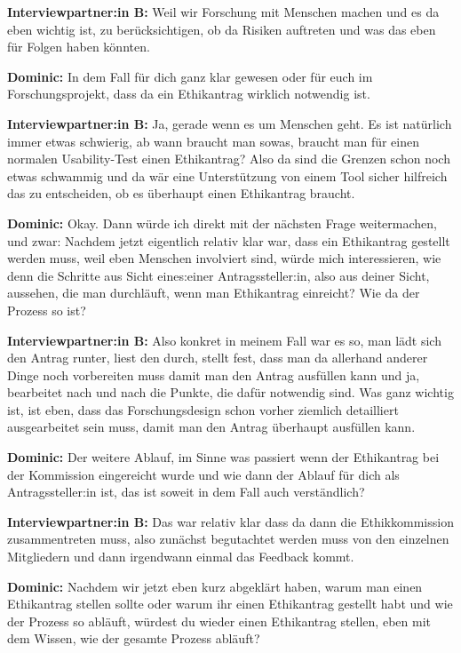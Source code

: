 \documentclass[a4paper,12pt,twoside]{scrreprt}
\begin{document}
\textbf{Interviewpartner:in B:} Weil wir Forschung mit Menschen machen und es da eben wichtig ist, zu berücksichtigen, ob da Risiken auftreten und was das eben für Folgen haben könnten.

\textbf{Dominic:} In dem Fall für dich ganz klar gewesen oder für euch im Forschungsprojekt, dass da ein Ethikantrag wirklich notwendig ist.

\textbf{Interviewpartner:in B:} Ja, gerade wenn es um Menschen geht. Es ist natürlich immer etwas schwierig, ab wann braucht man sowas, braucht man für einen normalen Usability-Test einen Ethikantrag? Also da sind die Grenzen schon noch etwas schwammig und da wär eine Unterstützung von einem Tool sicher hilfreich das zu entscheiden, ob es überhaupt einen Ethikantrag braucht.

\textbf{Dominic:} Okay. Dann würde ich direkt mit der nächsten Frage weitermachen, und zwar: Nachdem jetzt eigentlich relativ klar war, dass ein Ethikantrag gestellt werden muss, weil eben Menschen involviert sind, würde mich interessieren, wie denn die Schritte aus Sicht eines:einer Antragssteller:in, also aus deiner Sicht, aussehen, die man durchläuft, wenn man Ethikantrag einreicht? Wie da der Prozess so ist?

\textbf{Interviewpartner:in B:} Also konkret in meinem Fall war es so, man lädt sich den Antrag runter, liest den durch, stellt fest, dass man da allerhand anderer Dinge noch vorbereiten muss damit man den Antrag ausfüllen kann und ja, bearbeitet nach und nach die Punkte, die dafür notwendig sind. Was ganz wichtig ist, ist eben, dass das Forschungsdesign schon vorher ziemlich detailliert ausgearbeitet sein muss, damit man den Antrag überhaupt ausfüllen kann.

\textbf{Dominic:} Der weitere Ablauf, im Sinne was passiert wenn der Ethikantrag bei der Kommission eingereicht wurde und wie dann der Ablauf für dich als Antragssteller:in ist, das ist soweit in dem Fall auch verständlich?

\textbf{Interviewpartner:in B:} Das war relativ klar dass da dann die Ethikkommission zusammentreten muss, also zunächst begutachtet werden muss von den einzelnen Mitgliedern und dann irgendwann einmal das Feedback kommt.

\textbf{Dominic:} Nachdem wir jetzt eben kurz abgeklärt haben, warum man einen Ethikantrag stellen sollte oder warum ihr einen Ethikantrag gestellt habt und wie der Prozess so abläuft, würdest du wieder einen Ethikantrag stellen, eben mit dem Wissen, wie der gesamte Prozess abläuft?
\end{document}
